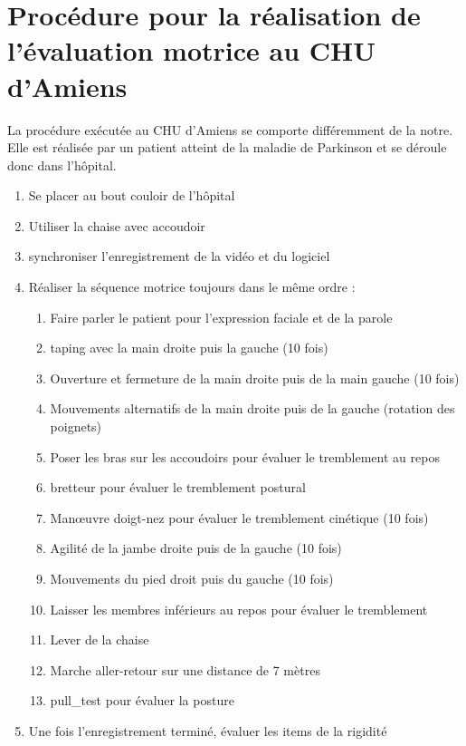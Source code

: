 \documentclass{article}
\begin{document}
\section{Procédure pour la réalisation de l'évaluation motrice au CHU d'Amiens}
\label{proc_chu}

La procédure exécutée au CHU d'Amiens se comporte différemment de la notre. Elle est réalisée par un patient atteint de la maladie de Parkinson et se déroule donc dans l'hôpital. 
\begin{enumerate}
	\item Se placer au bout couloir de l'hôpital
	\item Utiliser la chaise avec accoudoir 
	\item synchroniser l'enregistrement de la vidéo et du logiciel
	\item Réaliser la séquence motrice toujours dans le même ordre :
	\begin{enumerate}
		\item Faire parler le patient pour l'expression faciale et de la parole
		\item \Gls{taping} avec la main droite puis la gauche (10 fois)
		\item Ouverture et fermeture de la main droite puis de la main gauche (10 fois) 
		\item Mouvements alternatifs de la main droite puis de la gauche (rotation des poignets)
		\item Poser les bras sur les accoudoirs pour évaluer le tremblement au repos
		\item \Gls{bretteur} pour évaluer le tremblement postural
		\item Man\oe{}uvre doigt-nez pour évaluer le tremblement cinétique (10 fois)
		\item Agilité de la jambe droite puis de la gauche (10 fois)
		\item Mouvements du pied droit puis du gauche (10 fois)
		\item Laisser les membres inférieurs au repos pour évaluer le tremblement
		\item Lever de la chaise
		\item Marche aller-retour sur une distance de 7 mètres
		\item \Gls{pull_test} pour évaluer la posture 
	\end{enumerate}
	\item Une fois l'enregistrement terminé, évaluer les items de la rigidité
\end{enumerate}
\end{document}
